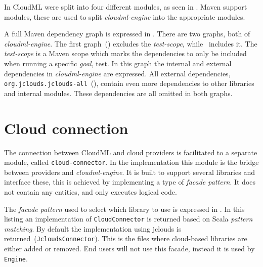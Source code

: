 In  CloudML were split into four different modules, as seen in .
Maven support modules, these are used to split \emph{cloudml-engine} into the appropriate 
modules.

A full Maven dependency graph is expressed in .
There are two graphs, both of \emph{cloudml-engine}.
The first graph~() excludes the \emph{test-scope},
while~ includes it.
The \emph{test-scope} is a Maven scope which marks the dependencies to only be included
when running a specific \emph{goal}, \eg test.
In this graph the internal and external dependencies in \emph{cloudml-engine} are expressed.
All external dependencies, 
\eg \texttt{org.jclouds.jclouds-all}~(),
contain even more dependencies to other libraries and internal modules.
These dependencies are all omitted in both graphs.


\section{Cloud connection}


The connection between CloudML and cloud providers is facilitated 
to a separate module, called \texttt{cloud-connector}.
In the implementation this module is the bridge between providers and \emph{cloudml-engine}.
It is built to support several libraries and interface these,
this is achieved by implementing a type of \emph{facade pattern}.
It does not contain any entities, and only executes logical code. 

The \emph{facade pattern} used to select which library to use is expressed in
.
In this listing an implementation of \texttt{CloudConnector} is returned
based on Scala \emph{pattern matching}.
By default the implementation using jclouds is returned~(\texttt{JcloudsConnector}).
This is the files where cloud-based libraries are either added or removed.
End users will not use this facade, instead it is used by \texttt{Engine}.

